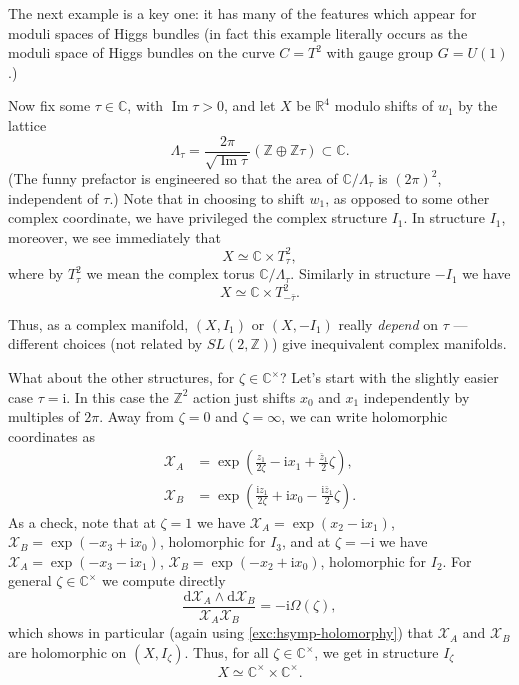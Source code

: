 \documentclass[12pt,letterpaper,reqno]{article}
\numberwithin{equation}{section}
\newcommand{\cX}{\ensuremath{\mathcal X}}
\newcommand{\R}{\ensuremath{\mathbb R}}
\newcommand{\C}{\ensuremath{\mathbb C}}
\newcommand{\Z}{\ensuremath{\mathbb Z}}
\newcommand{\I}{{\mathrm i}}
\newcommand{\de}{\mathrm{d}}
\newcommand{\ti}[1]{\textit{#1}}
\DeclareMathOperator{\im}{Im}
\begin{document}
The next example is a key one: it has many of the features 
which appear for moduli spaces of Higgs bundles (in fact 
this example literally occurs as the moduli space of 
Higgs bundles on the curve $C = T^2$ with gauge group
$G = U(1)$.)
\begin{example}[$\R^2 \times T^2$] \label{exa:R2T2}
Now fix some $\tau \in \C$, with $\im \tau > 0$, 
and let $X$ be $\R^4$ modulo shifts of $w_1$ by
the lattice 
\begin{equation}
  \Lambda_\tau = \frac{2\pi}{\sqrt{\im \tau}}(\Z \oplus \Z \tau) \subset \C.
\end{equation}
(The funny prefactor is engineered 
so that the area of $\C / \Lambda_\tau$
is $(2\pi)^2$, independent of $\tau$.)
Note that in choosing to shift $w_1$, as opposed to some other complex
coordinate, we have privileged the complex structure $I_1$. 
In structure $I_1$, moreover, we see immediately that
\begin{equation}
  X \simeq \C \times T^2_\tau,
\end{equation}
where by $T^2_\tau$ we mean the complex 
torus $\C / \Lambda_\tau$.
Similarly in structure $-I_1$ we have
\begin{equation}
  X \simeq \C \times T^2_{-\bar\tau}.
\end{equation}

Thus, as a complex manifold, $(X,I_1)$ or $(X,-I_1)$ really 
\ti{depend} on $\tau$ --- different choices (not related by $SL(2,\Z)$) 
give inequivalent complex manifolds.

What about the other structures, for $\zeta \in \C^\times$?
Let's start with the slightly easier case $\tau = \I$.
In this case the $\Z^2$ action just shifts $x_0$ and $x_1$
independently by multiples of $2\pi$.
Away from $\zeta = 0$ and $\zeta = \infty$, we can write
holomorphic coordinates as
\begin{align*}
  \cX_A &= \exp \left(\frac{z_1}{2\zeta} - \I x_1 + \frac{\bar{z}_1}{2} \zeta \right),\\
  \cX_B &= \exp \left(\frac{\I z_1}{2\zeta} + \I x_0 - \frac{\I \bar{z}_1}{2}  \zeta \right).
\end{align*}
As a check, note that at $\zeta = 1$ we have
$\cX_A = \exp(x_2 - \I x_1)$, $\cX_B = \exp(-x_3 + \I x_0)$, holomorphic
for $I_3$,
and at $\zeta = -\I$ we have
$\cX_A = \exp(- x_3 - \I x_1)$, $\cX_B = \exp(-x_2 + \I x_0)$,
holomorphic for $I_2$.
For general $\zeta \in \C^\times$ we compute directly
\begin{equation} \label{eq:hol-symp-R2T2}
  \frac{\de \cX_A \wedge \de \cX_B}{\cX_A \cX_B} = -\I \Omega(\zeta),
\end{equation}
which shows in particular (again using \autoref{exc:hsymp-holomorphy})
that $\cX_A$ and $\cX_B$ are holomorphic
on $(X,I_\zeta)$.
Thus, for all $\zeta \in \C^\times$, we get in structure $I_\zeta$
\begin{equation}
 X \simeq \C^\times \times \C^\times. 
\end{equation}


\end{example}
\end{document}
